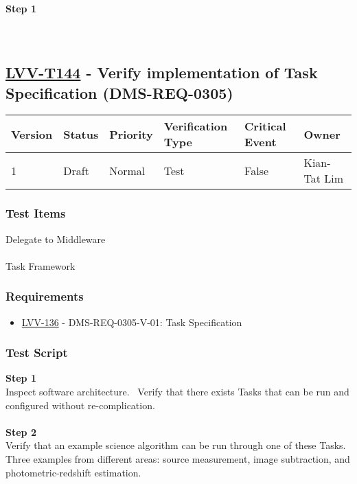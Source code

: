 \textbf{Step 1}\\
~\\
~\\

\hypertarget{lvv-t144---verify-implementation-of-task-specification-dms-req-0305}{%
\subsection{\texorpdfstring{\href{https://jira.lsstcorp.org/secure/Tests.jspa\#/testCase/LVV-T144}{LVV-T144}
- Verify implementation of Task Specification
(DMS-REQ-0305)}{LVV-T144 - Verify implementation of Task Specification (DMS-REQ-0305)}}\label{lvv-t144---verify-implementation-of-task-specification-dms-req-0305}}

\begin{longtable}[]{@{}llllll@{}}
\toprule
Version & Status & Priority & Verification Type & Critical Event &
Owner\tabularnewline
\midrule
\endhead
1 & Draft & Normal & Test & False & Kian-Tat Lim\tabularnewline
\bottomrule
\end{longtable}

\hypertarget{test-items-120}{%
\subsubsection{Test Items}\label{test-items-120}}

Delegate to Middleware\\
~\\
Task Framework

\hypertarget{requirements-121}{%
\subsubsection{Requirements}\label{requirements-121}}

\begin{itemize}
\tightlist
\item
  \href{https://jira.lsstcorp.org/browse/LVV-136}{LVV-136} -
  DMS-REQ-0305-V-01: Task Specification
\end{itemize}

\hypertarget{test-script-121}{%
\subsubsection{Test Script}\label{test-script-121}}

\textbf{Step 1}\\
Inspect software architecture. ~Verify that there exists Tasks that can
be run and configured without re-complication.\\
~\\
\textbf{Step 2}\\
Verify that an example science algorithm can be run through one of these
Tasks.~ Three examples from different areas: source measurement, image
subtraction, and photometric-redshift estimation.\\
~\\

